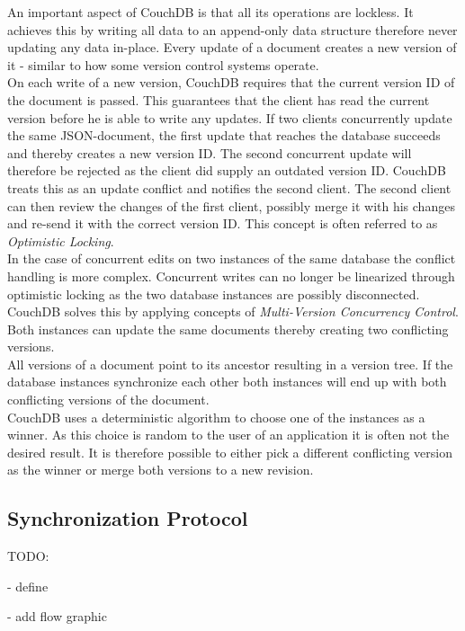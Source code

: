 An important aspect of CouchDB is that all its operations are lockless.
It achieves this by writing all data to an append-only data structure therefore never updating any data in-place.
Every update of a document creates a new version of it - similar to how some version control systems operate.\\
On each write of a new version, CouchDB requires that the current version ID of the document is passed.
This guarantees that the client has read the current version before he is able to write any updates.
If two clients concurrently update the same JSON-document, the first update that reaches the database succeeds and thereby creates a new version ID.
The second concurrent update will therefore be rejected as the client did supply an outdated version ID.
CouchDB treats this as an update conflict and notifies the second client.
The second client can then review the changes of the first client, possibly merge it with his changes and re-send it with the correct version ID.
This concept is often referred to as \emph{Optimistic Locking}.\\

In the case of concurrent edits on two instances of the same database the conflict handling is more complex.
Concurrent writes can no longer be linearized through optimistic locking as the two database instances are possibly disconnected.\\
CouchDB solves this by applying concepts of \emph{Multi-Version Concurrency Control}.
Both instances can update the same documents thereby creating two conflicting versions.\\
All versions of a document point to its ancestor resulting in a version tree.
If the database instances synchronize each other both instances will end up with both conflicting versions of the document.\\
CouchDB uses a deterministic algorithm to choose one of the instances as a winner.
As this choice is random to the user of an application it is often not the desired result.
It is therefore possible to either pick a different conflicting version as the winner or merge both versions to a new revision.

\subsection{Synchronization Protocol}

TODO:

- define

- add flow graphic

